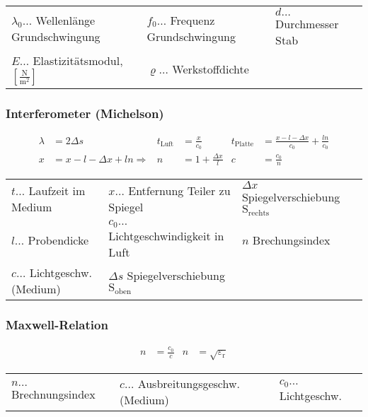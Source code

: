 				\begin{table}[h]
				\begin{tabular}{lll}
					$\lambda_0\dots$ Wellenlänge Grundschwingung & $f_0\dots$ Frequenz Grundschwingung & $d\dots$ Durchmesser Stab\\
					$E\dots$ Elastizitätsmodul,$\left[\frac{\mathrm{N}}{\mathrm{m}^2}\right]$ & $\varrho\dots$ Werkstoffdichte\\
				\end{tabular}
				\end{table}

			\subsubsection{Interferometer (Michelson)}
				\begin{align*}
					\lambda&=2\Delta s 
					& t_{\mathrm{Luft}}&=\frac{x}{c_0} 
					& t_{\mathrm{Platte}}&=\frac{x-l-\Delta x}{c_0}+\frac{ln}{c_0}\\
					x&=x-l-\Delta x+ln\Rightarrow & n&=1+\frac{\Delta x}{l} 
					& c&=\frac{c_0}{n}
				\end{align*}

				\begin{table}[h]
				\begin{tabular}{lll}
				$t\dots$ Laufzeit im Medium & $x\dots$ Entfernung Teiler zu Spiegel & $\Delta x$ Spiegelverschiebung $\mathrm{S}_{\mathrm{rechts}}$\\
				$l\dots$ Probendicke & $c_0\dots$ Lichtgeschwindigkeit in Luft & $n$ Brechungsindex\\
				$c\dots$ Lichtgeschw. (Medium) & $\Delta s$ Spiegelverschiebung $\mathrm{S}_{\mathrm{oben}}$\\
				\end{tabular}
				\end{table}
			
			\subsubsection{Maxwell-Relation}
				\begin{align*}
					n&=\frac{c_0}{c} & n&=\sqrt{\varepsilon_{\mathrm{r}}}
				\end{align*}

				\begin{table}[h]
				\begin{tabular}{lll}
					$n\dots$ Brechnungsindex & $c\dots$ Ausbreitungsgeschw. (Medium) & $c_0\dots$ Lichtgeschw.\\
				\end{tabular}
				\end{table}

